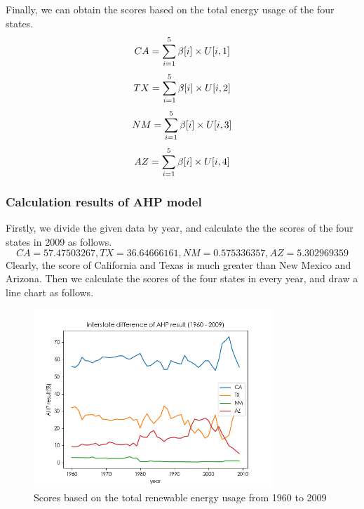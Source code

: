 \documentclass[a4paper,11pt]{article}
\begin{document}
\par Finally, we can obtain the scores based on the total energy usage of the four states.
\begin{equation}
    \centering
    CA=\sum_{i=1}^{5}\beta[i] \times U[i,1]
\end{equation}
\begin{equation}
    \centering
    TX=\sum_{i=1}^{5}\beta[i] \times U[i,2]
\end{equation}
\begin{equation}
    \centering
    NM=\sum_{i=1}^{5}\beta[i] \times U[i,3]
\end{equation}
\begin{equation}
    \centering
    AZ=\sum_{i=1}^{5}\beta[i] \times U[i,4]
\end{equation}

\subsubsection{Calculation results of AHP model}
\par Firstly, we divide the given data by year, and calculate the the scores of the four states in 2009 as follows.
\[
    CA=57.47503267, TX=36.64666161, NM=0.575336357, AZ=5.302969359
\]
Clearly, the score of California and Texas is much greater than New Mexico and Arizona.
Then we calculate the scores of the four states in every year, and draw a line chart as follows.
\begin{figure}[!hptb] 
    \centering 
    \includegraphics[width=0.8\textwidth]{./Pic/B-level-predict.png}
    \caption{Scores based on the total renewable energy usage from 1960 to 2009}
    \label{fig:B-level-predict}
\end{figure}
\end{document}
